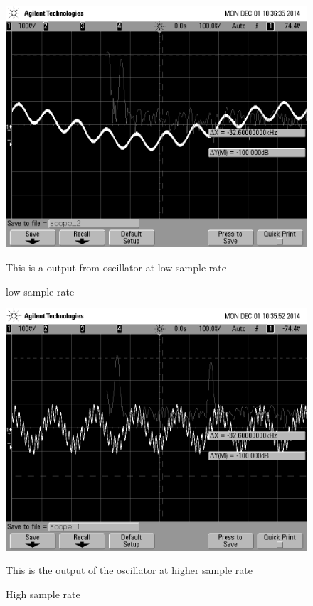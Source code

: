 \documentclass[11pt]{article}
\begin{document}
\begin{figure}[!h]
\includegraphics[scale = 0.25]{elec_4_1.png}

\caption{low sample rate}

\begin{minipage}{0.75\textwidth}
{\footnotesize This is a output from oscillator at low sample rate}
\end{minipage}
\end{figure}

\begin{figure}[!h]
\includegraphics[scale = 0.25]{elec_4_2.png}

\caption{High sample rate }

\begin{minipage}{0.75\textwidth}
{\footnotesize This is the output of the oscillator at higher sample rate }
\end{minipage}
\end{figure}
\end{document}
